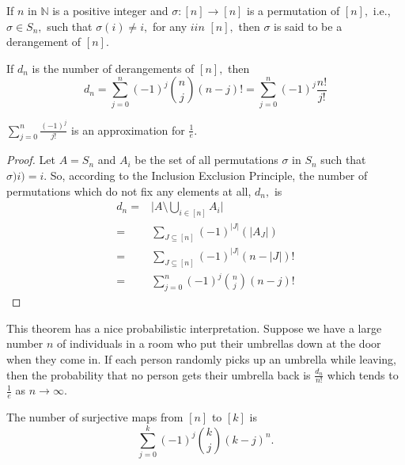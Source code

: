 
\begin{definition}[Derangements]
	If $n$ in $\mathbb{N}$ is a positive integer and $\sigma \colon [n] \to [n]$ is a permutation of $[n],$ i.e., $\sigma \in S_n,$ such that
	$\sigma(i) \not = i,$ for any $i in $ $[n],$ then $\sigma$
	is said to be a derangement of $[n].$
\end{definition}
\begin{theorem}
	If $d_n$ is the number of derangements of $[n],$ then
	$$ d_n = \sum_{j=0}^{n}  (-1)^j \binom{n}{j} (n-j)!
	= \sum_{j=0}^{n} (-1)^j \frac{n!}{j!} $$
\end{theorem}

\begin{remark}
	$\sum_{j=0}^{n} \frac{(-1)^j}{j!} $ is an approximation for 
	$ \frac{1}{e}.$
\end{remark}

\begin{proof}
	Let $A = S_n$ and $A_i$ be the set of all permutations $\sigma$
	in $S_n$ such that $\sigma)i) = i.$ So, according to  the Inclusion Exclusion Principle, the number of permutations which do not fix any elements at all, $d_n,$ is
	\begin{align*}
		d_n = {}& \lvert A \setminus \bigcup_{i \in [n]} A_i \rvert \\
		={}& \sum_{J \subseteq [n]} (-1)^{ \lvert J \rvert} 
		\left( \lvert A_J \rvert \right) \\
		={}& \sum_{J \subseteq [n]} (-1)^{ \lvert J \rvert} 
		(n - \lvert J \rvert )!\\
		={}& \sum_{j=0}^{n} (-1)^j \binom{n}{j} (n-j)!
	\end{align*}
\end{proof}

This theorem has a nice probabilistic interpretation.
Suppose we have a large number $n$ of individuals in a room who put their 
umbrellas down at the door when they come in. If each person randomly picks up an umbrella while leaving, then the probability that no person gets their umbrella back is $ \frac{d_n}{n!}$ which tends to $ \frac{1}{e}$ as $n \to \infty.$

\begin{theorem}
	The number of surjective maps from $[n]$ to $[k]$ is 
	$$ \sum_{j=0}^{k} (-1)^j \binom{k}{j} (k-j)^n.$$
\end{theorem}

